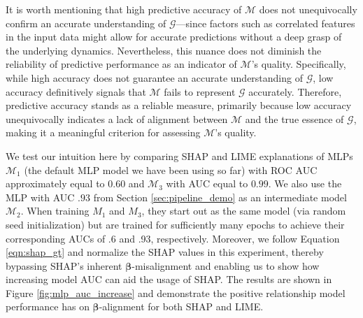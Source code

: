\documentclass[mnsc,blindrev]{informs3}
\begin{document}
           It is worth mentioning that high predictive accuracy of $\mathcal{M}$ does not unequivocally confirm an accurate understanding of $\mathcal{G}$—since factors such as correlated features in the input data might allow for accurate predictions without a deep grasp of the underlying dynamics. Nevertheless, this nuance does not diminish the reliability of predictive performance as an indicator of $\mathcal{M}$'s quality. Specifically, while high accuracy does not guarantee an accurate understanding of $\mathcal{G}$, low accuracy definitively signals that $\mathcal{M}$ fails to represent $\mathcal{G}$ accurately. Therefore, predictive accuracy stands as a reliable measure, primarily because low accuracy unequivocally indicates a lack of alignment between $\mathcal{M}$ and the true essence of $\mathcal{G}$, making it a meaningful criterion for assessing $\mathcal{M}$'s quality.


            
            We test our intuition here by comparing SHAP and LIME explanations of MLPs $\mathcal{M}_1$ (the default MLP model we have been using so far) with ROC AUC approximately equal to $0.60$ and $\mathcal{M}_3$ with AUC equal to $0.99$. We also use the MLP with AUC $.93$ from Section \ref{sec:pipeline_demo} as an intermediate model $\mathcal{M}_2$. When training $M_1$ and $M_3$, they start out as the same model (via random seed initialization) but are trained for sufficiently many epochs to achieve their corresponding AUCs of .6 and .93, respectively. Moreover, we follow Equation \ref{eqn:shap_gt} and normalize the SHAP values in this experiment, thereby bypassing SHAP's inherent $\boldsymbol{\beta}$-misalignment and enabling us to show how increasing model AUC can aid the usage of SHAP. The results are shown in Figure \ref{fig:mlp_auc_increase} and demonstrate the positive relationship model performance has on $\boldsymbol{\beta}$-alignment for both SHAP and LIME.
            
\end{document}
